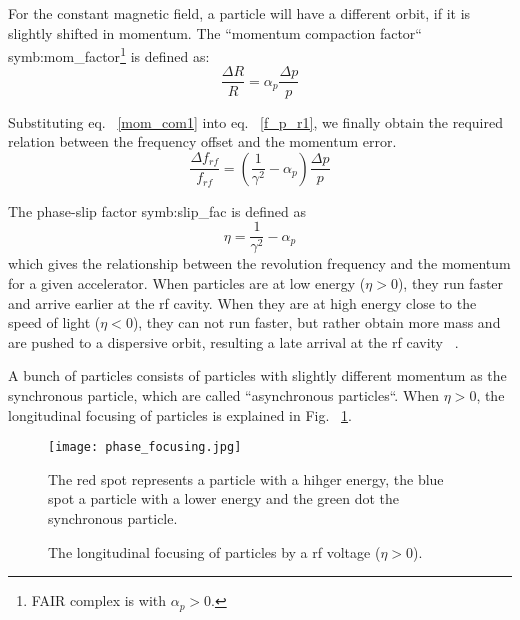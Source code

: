 For the constant magnetic field, a particle will have a different orbit, if it is slightly shifted in momentum. The ``momentum compaction factor`` \gls{symb:mom_factor}\footnote{FAIR complex is with $\alpha_p>0$.} is defined as:
\begin{equation}
\frac{\Delta R}{R}=\alpha_p\frac{\Delta p}{p}\label{mom_com1}
\end{equation} 


Substituting eq. ~\ref{mom_com1} into eq. ~\ref{f_p_r1}, we finally obtain the required relation between the frequency offset and the momentum error.
\begin{equation}
\frac{\Delta f_{\mathit{rf}}}{f_{\mathit{rf}}} = (\frac{1}{\gamma^2}-\alpha_{\mathit{p}})\frac{\Delta{p}}{p}
\label{eq:phaseP1}
\end{equation}

The phase-slip factor \gls{symb:slip_fac} is defined as
\begin{equation}
\label{eq:phse_slip}
\eta =\frac{1}{\gamma^2}-\alpha_{\mathit{p}}
\end{equation}
which gives the relationship between the revolution frequency and the momentum for a given accelerator. When particles are at low energy ($\eta > 0$), they run faster and arrive earlier at the rf cavity. When they are at high energy close to the speed of light ($\eta < 0$), they can not run faster, but rather obtain more mass and are pushed to a dispersive orbit, resulting a late arrival at the rf cavity ~\cite{lee_accelerator_2011}. 

A bunch of particles consists of particles with slightly different momentum as the synchronous particle, which are called ``asynchronous particles``. When $\eta > 0$, the longitudinal focusing of particles is explained in Fig. ~\ref{phase_focusing}. 
\begin{figure}[!htb]
   \centering   
   \texttt{[image: phase\_focusing.jpg]}
   \caption{The longitudinal focusing of particles by a rf voltage ($\eta > 0$).}{The red spot represents a particle with a hihger energy, the blue spot a particle with a lower energy and the green dot the synchronous particle.}
   \label{phase_focusing}
\end{figure}


